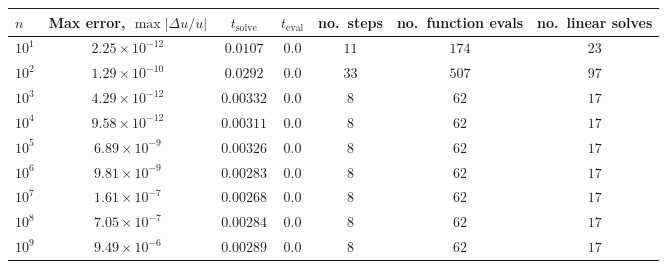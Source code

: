 \begin{tabular}{l c c c c c c}
\hline \hline 
$n$  &  Max error, $\max|\Delta u/u|$  &  $t_{\mathrm{solve}}$  &  $t_{\mathrm{eval}}$  &  no.\ steps  &  no.\ function evals  &  no.\ linear solves  \\ \hline
$10^1$  &  $2.25 \times 10^{-12}$  &  $0.0107$  &  $0.0$  &  $11$  &  $174$  &  $23$ \\ 
$10^2$  &  $1.29 \times 10^{-10}$  &  $0.0292$  &  $0.0$  &  $33$  &  $507$  &  $97$ \\ 
$10^3$  &  $4.29 \times 10^{-12}$  &  $0.00332$  &  $0.0$  &  $8$  &  $62$  &  $17$ \\ 
$10^4$  &  $9.58 \times 10^{-12}$  &  $0.00311$  &  $0.0$  &  $8$  &  $62$  &  $17$ \\ 
$10^5$  &  $6.89 \times 10^{-9}$  &  $0.00326$  &  $0.0$  &  $8$  &  $62$  &  $17$ \\ 
$10^6$  &  $9.81 \times 10^{-9}$  &  $0.00283$  &  $0.0$  &  $8$  &  $62$  &  $17$ \\ 
$10^7$  &  $1.61 \times 10^{-7}$  &  $0.00268$  &  $0.0$  &  $8$  &  $62$  &  $17$ \\ 
$10^8$  &  $7.05 \times 10^{-7}$  &  $0.00284$  &  $0.0$  &  $8$  &  $62$  &  $17$ \\ 
$10^9$  &  $9.49 \times 10^{-6}$  &  $0.00289$  &  $0.0$  &  $8$  &  $62$  &  $17$ \\ 
\hline \hline
\end{tabular}
